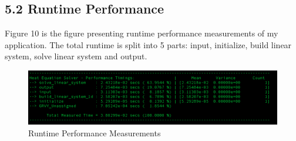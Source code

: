 \documentclass{article}
\begin{document}
\subsection*{5.2 Runtime Performance}
Figure 10 is the figure presenting runtime performance measurements of my application. The total runtime is split into 5 parts: input, initialize, build linear system, solve linear system and output.

\begin{figure}
  \includegraphics[width=\linewidth]{figure_10}
  \caption{Runtime Performance Measurements}
\end{figure}
\end{document}
